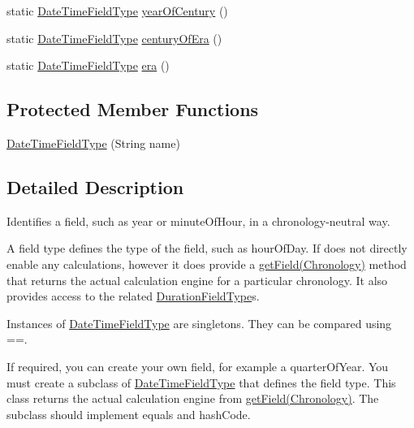\begin{DoxyCompactItemize}
\item 
static \hyperlink{classorg_1_1joda_1_1time_1_1_date_time_field_type}{Date\-Time\-Field\-Type} \hyperlink{classorg_1_1joda_1_1time_1_1_date_time_field_type_ab5c278ffc8b8ac83c17ffa5d4c174160}{year\-Of\-Century} ()
\item 
static \hyperlink{classorg_1_1joda_1_1time_1_1_date_time_field_type}{Date\-Time\-Field\-Type} \hyperlink{classorg_1_1joda_1_1time_1_1_date_time_field_type_a2d56281fd58186f56852f83e5ff873dd}{century\-Of\-Era} ()
\item 
static \hyperlink{classorg_1_1joda_1_1time_1_1_date_time_field_type}{Date\-Time\-Field\-Type} \hyperlink{classorg_1_1joda_1_1time_1_1_date_time_field_type_a2c93114b8d0f4f0394f83c8cb99f9100}{era} ()
\end{DoxyCompactItemize}
\subsection*{Protected Member Functions}
\begin{DoxyCompactItemize}
\item 
\hyperlink{classorg_1_1joda_1_1time_1_1_date_time_field_type_a7e690bd01829c078c3f7f86ea4d8deb8}{Date\-Time\-Field\-Type} (String name)
\end{DoxyCompactItemize}


\subsection{Detailed Description}
Identifies a field, such as year or minute\-Of\-Hour, in a chronology-\/neutral way. 

A field type defines the type of the field, such as hour\-Of\-Day. If does not directly enable any calculations, however it does provide a \hyperlink{classorg_1_1joda_1_1time_1_1_date_time_field_type_a8215ddcf8f87212827137cda2035c557}{get\-Field(\-Chronology)} method that returns the actual calculation engine for a particular chronology. It also provides access to the related \hyperlink{classorg_1_1joda_1_1time_1_1_duration_field_type}{Duration\-Field\-Type}s. 

Instances of {\ttfamily \hyperlink{classorg_1_1joda_1_1time_1_1_date_time_field_type}{Date\-Time\-Field\-Type}} are singletons. They can be compared using {\ttfamily ==}. 

If required, you can create your own field, for example a quarter\-Of\-Year. You must create a subclass of {\ttfamily \hyperlink{classorg_1_1joda_1_1time_1_1_date_time_field_type}{Date\-Time\-Field\-Type}} that defines the field type. This class returns the actual calculation engine from \hyperlink{classorg_1_1joda_1_1time_1_1_date_time_field_type_a8215ddcf8f87212827137cda2035c557}{get\-Field(\-Chronology)}. The subclass should implement equals and hash\-Code.

